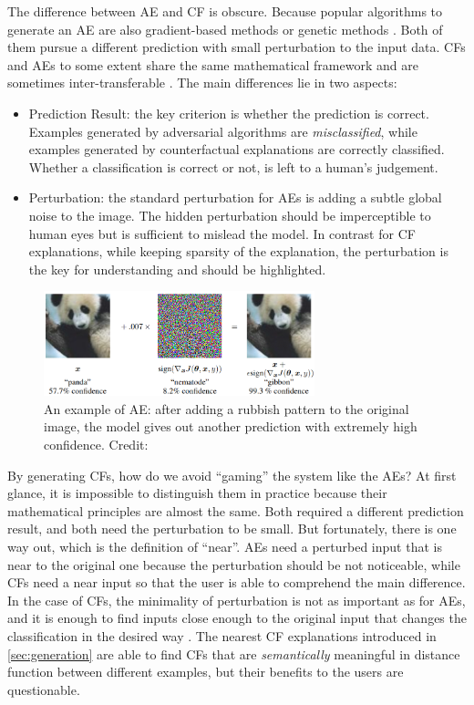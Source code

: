 The difference between AE and CF is obscure. Because popular algorithms to generate an AE are also gradient-based methods or genetic methods \cite{AEoverview}. Both of them pursue a different prediction with small perturbation to the input data. CFs and AEs to some extent share the same mathematical framework and are sometimes inter-transferable \cite{CFandAE}. The main differences lie in two aspects:
\begin{itemize}
  \item Prediction Result: the key criterion is whether the prediction is correct. Examples generated by adversarial algorithms are \emph{misclassified}, while examples generated by counterfactual explanations are correctly classified. Whether a classification is correct or not, is left to a human's judgement.
  \item Perturbation: the standard perturbation for AEs is adding a subtle global noise to the image. The hidden perturbation should be imperceptible to human eyes but is sufficient to mislead the model. In contrast for CF explanations, while keeping sparsity of the explanation, the perturbation is the key for understanding and should be highlighted.  %
\end{itemize}
\begin{figure}
  \centering
  \includegraphics[width=0.7\textwidth]{adversarial.PNG}
  \caption{An example of AE: after adding a rubbish pattern to the original image, the model gives out another prediction with extremely high confidence. Credit: \cite{goodfellow2014explaining}}
    \label{fig:AE}
\end{figure}

By generating CFs, how do we avoid  ``gaming'' the system like the AEs? At first glance, it is impossible to distinguish them in practice because their mathematical principles are almost the same. Both required a different prediction result, and both need the perturbation to be small. But fortunately, there is one way out, which is the definition of ``near''. AEs need a perturbed input that is near to the original one because the perturbation should be not noticeable, while CFs need a near input so that the user is able to comprehend the main difference. In the case of CFs, the minimality of perturbation is not as important as for AEs, and it is enough to find inputs close enough to the original input that changes the classification in the desired way \cite{CFandAE}. The nearest CF explanations introduced in \autoref{sec:generation} are able to find CFs that are \emph{semantically} meaningful in distance function between different examples, but their benefits to the users are questionable.

